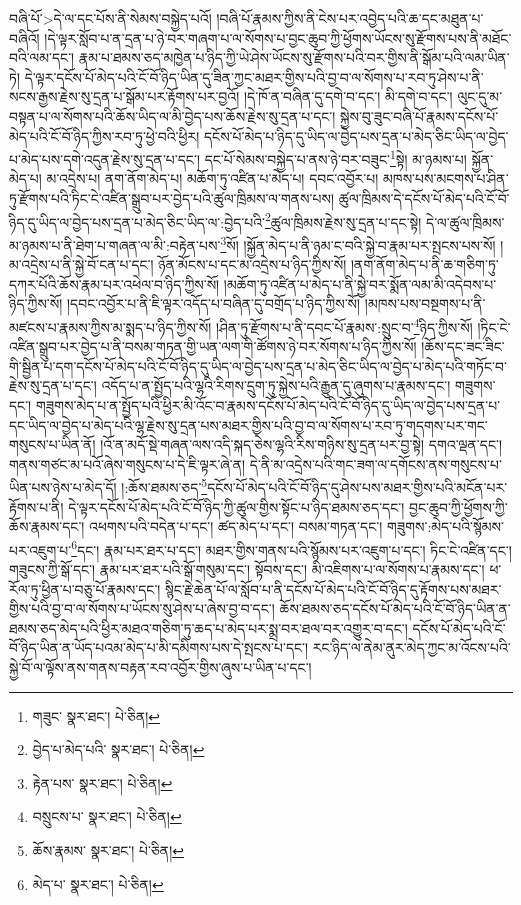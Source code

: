 བཞི་པོ་>དེ་ལ་དང་པོས་ནི་སེམས་བསྐྱེད་པའོ། །བཞི་པོ་རྣམས་ཀྱིས་ནི་ངེས་པར་འབྱེད་པའི་ཆ་དང་མཐུན་པ་བཞིའོ། །དེ་ལྟར་སློབ་པ་ན་དྲན་པ་ཉེ་བར་གཞག་པ་ལ་སོགས་པ་བྱང་ཆུབ་ཀྱི་ཕྱོགས་ཡོངས་སུ་རྫོགས་པས་ནི་མཐོང་བའི་ལམ་དང་། རྣམ་པ་ཐམས་ཅད་མཁྱེན་པ་ཉིད་ཀྱི་ཡེ་ཤེས་ཡོངས་སུ་རྫོགས་པའི་བར་གྱིས་ནི་སྒོམ་པའི་ལམ་ཡིན་ཏེ། དེ་ལྟར་དངོས་པོ་མེད་པའི་ངོ་བོ་ཉིད་ཡིན་དུ་ཟིན་ཀྱང་མཐར་གྱིས་པའི་བྱ་བ་ལ་སོགས་པ་རབ་ཏུ་ཤེས་པ་ནི་སངས་རྒྱས་རྗེས་སུ་དྲན་པ་སྒོམ་པར་རྟོགས་པར་བྱའོ། །དེ་ཁོ་ན་བཞིན་དུ་དགེ་བ་དང་། མི་དགེ་བ་དང་། ལུང་དུ་མ་བསྟན་པ་ལ་སོགས་པའི་ཆོས་ཡིད་ལ་མི་བྱེད་པས་ཆོས་རྗེས་སུ་དྲན་པ་དང་། སྐྱེས་བུ་ཟུང་བཞི་པོ་རྣམས་དངོས་པོ་མེད་པའི་ངོ་བོ་ཉིད་ཀྱིས་རབ་ཏུ་ཕྱེ་བའི་ཕྱིར། དངོས་པོ་མེད་པ་ཉིད་དུ་ཡིད་ལ་བྱེད་པས་དྲན་པ་མེད་ཅིང་ཡིད་ལ་བྱེད་པ་མེད་པས་དགེ་འདུན་རྗེས་སུ་དྲན་པ་དང་། དང་པོ་སེམས་བསྐྱེད་པ་ནས་ཉེ་བར་བཟུང་\footnote{གཟུང་  སྣར་ཐང་།  པེ་ཅིན། }སྟེ། མ་ཉམས་པ། སྐྱོན་མེད་པ། མ་འདྲེས་པ། ནག་ནོག་མེད་པ། མཆོག་ཏུ་འཛིན་པ་མེད་པ། དབང་འབྱོར་པ། མཁས་པས་མངགས་པ་ཤིན་ཏུ་རྫོགས་པའི་ཏིང་ངེ་འཛིན་སྒྲུབ་པར་བྱེད་པའི་ཚུལ་ཁྲིམས་ལ་གནས་པས། ཚུལ་ཁྲིམས་དེ་དངོས་པོ་མེད་པའི་ངོ་བོ་ཉིད་དུ་ཡིད་ལ་བྱེད་པས་དྲན་པ་མེད་ཅིང་ཡིད་ལ་:བྱེད་པའི་\footnote{བྱེད་པ་མེད་པའི་  སྣར་ཐང་།  པེ་ཅིན། }ཚུལ་ཁྲིམས་རྗེས་སུ་དྲན་པ་དང་སྟེ། དེ་ལ་ཚུལ་ཁྲིམས་མ་ཉམས་པ་ནི་ཐེག་པ་གཞན་ལ་མི་:བརྟེན་པས་\footnote{རྟེན་པས་  སྣར་ཐང་།  པེ་ཅིན། }སོ། །སྐྱོན་མེད་པ་ནི་ཉམ་ང་བའི་སྐྱེ་བ་རྣམ་པར་སྤངས་པས་སོ། །མ་འདྲེས་པ་ནི་སྐྱེ་བོ་ངན་པ་དང་། ཉོན་མོངས་པ་དང་མ་འདྲེས་པ་ཉིད་ཀྱིས་སོ། །ནག་ནོག་མེད་པ་ནི་ཆ་གཅིག་ཏུ་དཀར་པོའི་ཆོས་རྣམ་པར་འཕེལ་བ་ཉིད་ཀྱིས་སོ། །མཆོག་ཏུ་འཛིན་པ་མེད་པ་ནི་སྐྱེ་བར་སྨོན་ལམ་མི་འདེབས་པ་ཉིད་ཀྱིས་སོ། །དབང་འབྱོར་པ་ནི་ཇི་ལྟར་འདོད་པ་བཞིན་དུ་བགྲོད་པ་ཉིད་ཀྱིས་སོ། །མཁས་པས་བསྔགས་པ་ནི་མཛངས་པ་རྣམས་ཀྱིས་མ་སྨད་པ་ཉིད་ཀྱིས་སོ། །ཤིན་ཏུ་རྫོགས་པ་ནི་དབང་པོ་རྣམས་:སྲུང་བ་\footnote{བསྲུངས་པ་  སྣར་ཐང་།  པེ་ཅིན། }ཉིད་ཀྱིས་སོ། །ཏིང་ངེ་འཛིན་སྒྲུབ་པར་བྱེད་པ་ནི་བསམ་གཏན་གྱི་ཡན་ལག་གི་ཚོགས་ཉེ་བར་སོགས་པ་ཉིད་ཀྱིས་སོ། །ཆོས་དང་ཟང་ཟིང་གི་སྦྱིན་པ་དག་དངོས་པོ་མེད་པའི་ངོ་བོ་ཉིད་དུ་ཡིད་ལ་བྱེད་པས་དྲན་པ་མེད་ཅིང་ཡིད་ལ་བྱེད་པ་མེད་པའི་གཏོང་བ་རྗེས་སུ་དྲན་པ་དང་། འདོད་པ་ན་སྤྱོད་པའི་ལྷའི་རིགས་དྲུག་ཏུ་སྐྱེས་པའི་རྒྱུན་དུ་ཞུགས་པ་རྣམས་དང་། གཟུགས་དང་། གཟུགས་མེད་པ་ན་སྤྱོད་པའི་ཕྱིར་མི་འོང་བ་རྣམས་དངོས་པོ་མེད་པའི་ངོ་བོ་ཉིད་དུ་ཡིད་ལ་བྱེད་པས་དྲན་པ་དང་ཡིད་ལ་བྱེད་པ་མེད་པའི་ལྷ་རྗེས་སུ་དྲན་པས་མཐར་གྱིས་པའི་བྱ་བ་ལ་སོགས་པ་རབ་ཏུ་གདགས་པར་གང་གསུངས་པ་ཡིན་ནོ། །འོ་ན་མདོ་སྡེ་གཞན་ལས་འདི་སྐད་ཅེས་ལྷའི་རིས་གཉིས་སུ་དྲན་པར་བྱ་སྟེ། དགའ་ལྡན་དང་། གནས་གཙང་མ་པའོ་ཞེས་གསུངས་པ་དེ་ཇི་ལྟར་ཞེ་ན། དེ་ནི་མ་འདྲེས་པའི་གང་ཟག་ལ་དགོངས་ནས་གསུངས་པ་ཡིན་པས་ཉེས་པ་མེད་དོ། །:ཆོས་ཐམས་ཅད་\footnote{ཆོས་རྣམས་  སྣར་ཐང་།  པེ་ཅིན། }དངོས་པོ་མེད་པའི་ངོ་བོ་ཉིད་དུ་ཤེས་པས་མཐར་གྱིས་པའི་མངོན་པར་རྟོགས་པ་ནི། དེ་ལྟར་དངོས་པོ་མེད་པའི་ངོ་བོ་ཉིད་ཀྱི་ཚུལ་གྱིས་སྟོང་པ་ཉིད་ཐམས་ཅད་དང་། བྱང་ཆུབ་ཀྱི་ཕྱོགས་ཀྱི་ཆོས་རྣམས་དང་། འཕགས་པའི་བདེན་པ་དང་། ཚད་མེད་པ་དང་། བསམ་གཏན་དང་། གཟུགས་:མེད་པའི་སྙོམས་པར་འཇུག་པ་\footnote{མེད་པ་  སྣར་ཐང་།  པེ་ཅིན། }དང་། རྣམ་པར་ཐར་པ་དང་། མཐར་གྱིས་གནས་པའི་སྙོམས་པར་འཇུག་པ་དང་། ཏིང་ངེ་འཛིན་དང་། གཟུངས་ཀྱི་སྒོ་དང་། རྣམ་པར་ཐར་པའི་སྒོ་གསུམ་དང་། སྟོབས་དང་། མི་འཇིགས་པ་ལ་སོགས་པ་རྣམས་དང་། ཕ་རོལ་ཏུ་ཕྱིན་པ་བཅུ་པོ་རྣམས་དང་། སྙིང་རྗེ་ཆེན་པོ་ལ་སློབ་པ་ནི་དངོས་པོ་མེད་པའི་ངོ་བོ་ཉིད་དུ་རྟོགས་པས་མཐར་གྱིས་པའི་བྱ་བ་ལ་སོགས་པ་ཡོངས་སུ་ཤེས་པ་ཞེས་བྱ་བ་དང་། ཆོས་ཐམས་ཅད་དངོས་པོ་མེད་པའི་ངོ་བོ་ཉིད་ཡིན་ན་ཐམས་ཅད་མེད་པའི་ཕྱིར་མཐའ་གཅིག་ཏུ་ཆད་པ་མེད་པར་སྨྲ་བར་ཐལ་བར་འགྱུར་བ་དང་། དངོས་པོ་མེད་པའི་ངོ་བོ་ཉིད་ཡིན་ན་ཡོད་པའམ་མེད་པ་མི་དམིགས་པས་དེ་སྤངས་པ་དང་། རང་ཉིད་ལ་ནེམ་ནུར་མེད་ཀྱང་མ་འོངས་པའི་སྐྱེ་བོ་ལ་ལྟོས་ནས་གནས་བརྟན་རབ་འབྱོར་གྱིས་ཞུས་པ་ཡིན་པ་དང་། 